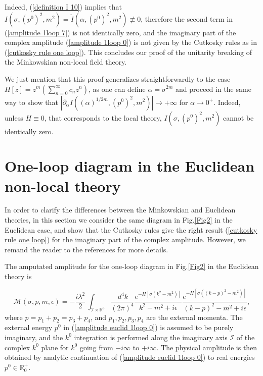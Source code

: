 \documentclass[a4paper,11pt]{article}
\begin{document}
Indeed, (\ref{definition I 10}) implies that $I(\sigma,(p^0)^2,m^2)=\tilde{I}(\alpha,(p^0)^2,m^2)\not\equiv 0$, therefore the second term in (\ref{amplitude 1loop 7}) is not identically zero, and the imaginary part of the complex amplitude (\ref{amplitude 1loop 0}) is not given by the Cutkosky rules as in (\ref{cutkosky rule one loop}). This concludes our proof of the unitarity breaking  of the Minkowskian non-local field theory.


We just mention that this proof generalizes straightforwardly to the case $H[z]= z^m \left(\sum_{n=0}^{\infty}c_n z^n\right)$, as one  can define $\alpha= \sigma^{2m}$ and proceed in the same way to show that $|\partial_\alpha I((\alpha)^{1/2m},(p^0)^2,m^2)|\rightarrow + \infty$ for $\alpha\rightarrow0^+$. Indeed, unless $H\equiv 0$, that corresponds to the local theory, $I(\sigma,(p^0)^2,m^2)$ cannot be identically zero.






\section{One-loop diagram in the Euclidean non-local theory}\label{Section one loop Euclid}

In order to clarify the differences between the Minkowskian and Euclidean theories, in this section we consider the same diagram in Fig.\ref{Fig2} in the Euclidean case, and show that the Cutkosky rules give the right result (\ref{cutkosky rule one loop}) for the imaginary part of the complex amplitude. However, we remand the reader to the references \cite{unitarity1,unitarity2,unitarity3} for more details.

The amputated amplitude for the one-loop diagram in Fig.\ref{Fig2} in the Euclidean theory is 

\begin{equation}\label{amplitude euclid 1loop 0}
\mathcal{M}(\sigma,p,m,\epsilon) = -  \frac{i \lambda^2}{2} \, \int_{
\mathcal{I} \times	\mathbb{R}^3} \frac{ \, d^4 k}{(2\pi)^4}
\frac{e^{-H\left[\sigma\left(k^2-m^2\right)\right]}}{k^2 - m^2 + i \epsilon} \frac{e^{-H\left[\sigma\left(\left(k-p\right)^2-m^2\right)\right]}}{(k-p)^2 - m^2 + i \epsilon} ,
\end{equation}
where   $p = p_1+p_2=p_3+p_4$, and $p_1, p_2, p_3,p_4$ are the external momenta. The external energy $p^0$ in (\ref{amplitude euclid 1loop 0}) is assumed to be purely imaginary, and the $k^0$ integration is performed along the imaginary axis $\mathcal{I}$ of the complex $k^0$ plane for $k^0$ going from $- i \infty$ to $+ i \infty$. The physical amplitude is then obtained by analytic continuation of (\ref{amplitude euclid 1loop 0}) to real energies $p^0 \in \mathbb{R}^+_0$. 
\end{document}
